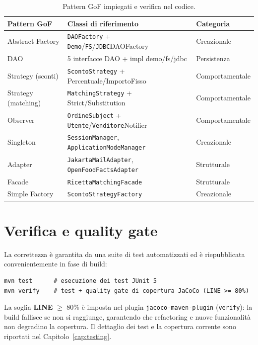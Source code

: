 \begin{table}[H]
    \centering
    \small
    \begin{tabular}{@{}lll@{}}
        \toprule
        \textbf{Pattern GoF} & \textbf{Classi di riferimento} & \textbf{Categoria}\\
        \midrule
        Abstract Factory & \texttt{DAOFactory} + \texttt{Demo}/\texttt{FS}/\texttt{JDBC}DAOFactory & Creazionale\\
        DAO & 5 interfacce DAO + impl demo/fs/jdbc & Persistenza\\
        Strategy (sconti) & \texttt{ScontoStrategy} + Percentuale/ImportoFisso & Comportamentale\\
        Strategy (matching) & \texttt{MatchingStrategy} + Strict/Substitution & Comportamentale\\
        Observer & \texttt{OrdineSubject} + \texttt{Utente}/\texttt{Venditore}Notifier & Comportamentale\\
        Singleton & \texttt{SessionManager}, \texttt{ApplicationModeManager} & Creazionale\\
        Adapter & \texttt{JakartaMailAdapter}, \texttt{OpenFoodFactsAdapter} & Strutturale\\
        Facade & \texttt{RicettaMatchingFacade} & Strutturale\\
        Simple Factory & \texttt{ScontoStrategyFactory} & Creazionale\\
        \bottomrule
    \end{tabular}
    \caption{Pattern GoF impiegati e verifica nel codice.}
    \label{tab:gof}
\end{table}

\section{Verifica e quality gate}
\label{sec:qualita_verifica}

La correttezza è garantita da una suite di test automatizzati ed è riepubblicata
convenientemente in fase di build:

\begin{verbatim}
mvn test      # esecuzione dei test JUnit 5
mvn verify    # test + quality gate di copertura JaCoCo (LINE >= 80%)
\end{verbatim}

La soglia \textbf{LINE} $\geq$ 80\% è imposta nel plugin \texttt{jacoco-maven-plugin}
(\texttt{verify}): la build fallisce se non si raggiunge, garantendo che
refactoring e nuove funzionalità non degradino la copertura. Il dettaglio dei
test e la copertura corrente sono riportati nel Capitolo~\ref{cap:testing}.

